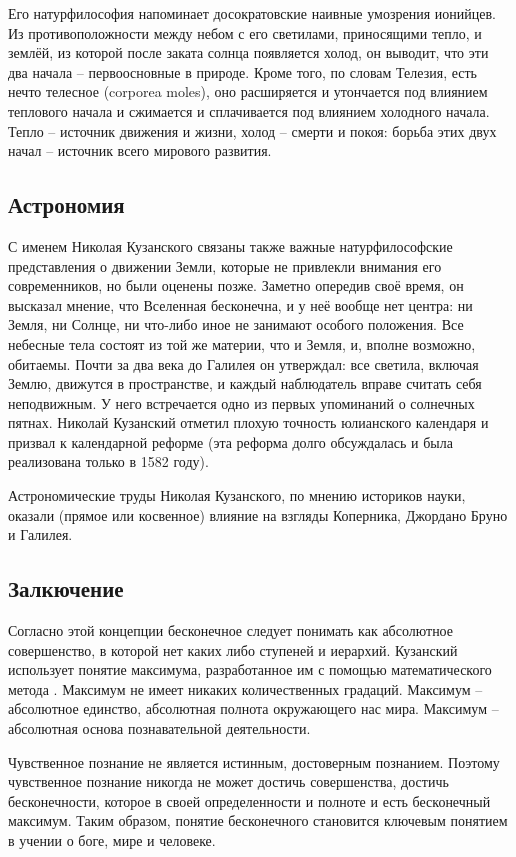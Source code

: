 \documentclass[a4paper, 14pt]{extreport}
\begin{document}
Его натурфилософия напоминает досократовские наивные умозрения ионийцев.
Из противоположности между небом с его светилами, приносящими тепло, и
землёй, из которой после заката солнца появляется холод, он выводит, что
эти два начала -- первоосновные в природе. Кроме того, по словам
Телезия, есть нечто телесное (corporea moles), оно расширяется и
утончается под влиянием теплового начала и сжимается и сплачивается под
влиянием холодного начала. Тепло -- источник движения и жизни, холод --
смерти и покоя: борьба этих двух начал -- источник всего мирового
развития.

\subsection{Астрономия}

С именем Николая Кузанского связаны также важные натурфилософские
представления о движении Земли, которые не привлекли внимания его
современников, но были оценены позже. Заметно опередив своё время, он
высказал мнение, что Вселенная бесконечна, и у неё вообще нет центра: ни
Земля, ни Солнце, ни что-либо иное не занимают особого положения. Все
небесные тела состоят из той же материи, что и Земля, и, вполне
возможно, обитаемы. Почти за два века до Галилея он утверждал: все
светила, включая Землю, движутся в пространстве, и каждый наблюдатель
вправе считать себя неподвижным. У него встречается одно из первых
упоминаний о солнечных пятнах. Николай Кузанский отметил плохую точность
юлианского календаря и призвал к календарной реформе (эта реформа долго
обсуждалась и была реализована только в 1582 году).

Астрономические труды Николая Кузанского, по мнению историков науки,
оказали (прямое или косвенное) влияние на взгляды Коперника, Джордано
Бруно и Галилея.

\subsection{Залкючение}

Согласно этой концепции бесконечное следует понимать как абсолютное
совершенство, в которой нет каких либо ступеней и иерархий. Кузанский
использует понятие максимума, разработанное им с помощью математического
метода . Максимум не имеет никаких количественных градаций. Максимум --
абсолютное единство, абсолютная полнота окружающего нас мира. Максимум
-- абсолютная основа познавательной деятельности.

Чувственное познание не является истинным, достоверным познанием.
Поэтому чувственное познание никогда не может достичь совершенства,
достичь бесконечности, которое в своей определенности и полноте и есть
бесконечный максимум. Таким образом, понятие бесконечного становится
ключевым понятием в учении о боге, мире и человеке.
\end{document}
